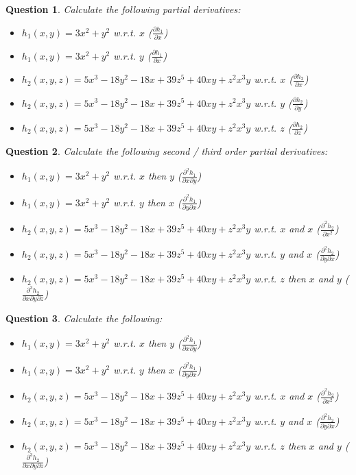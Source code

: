 \documentclass[]{article}
\newtheorem{question}{Question}
\begin{document}
	\begin{question}
		Calculate the following partial derivatives:\\
		\begin{itemize}
			\item $h_1(x,y) = 3x^2+y^2$ w.r.t. $x$ ($\frac{\partial h_1}{\partial x}$)
			\item $h_1(x,y) = 3x^2+y^2$ w.r.t. $y$ ($\frac{\partial h_1}{\partial x}$)
			\item $h_2(x,y,z) = 5x^3-18y^2-18x+39z^5+40xy+z^2x^3y$ w.r.t. $x$ ($\frac{\partial h_2}{\partial x}$)
			\item $h_2(x,y,z) = 5x^3-18y^2-18x+39z^5+40xy+z^2x^3y$ w.r.t. $y$ ($\frac{\partial h_2}{\partial y}$)
			\item $h_2(x,y,z) = 5x^3-18y^2-18x+39z^5+40xy+z^2x^3y$ w.r.t. $z$ ($\frac{\partial h_2}{\partial z}$)
		\end{itemize}
	\end{question}
	
	\begin{question}
		Calculate the following second / third order partial derivatives:\\
		\begin{itemize}
			\item $h_1(x,y) = 3x^2+y^2$ w.r.t. $x$ then $y$ ($\frac{\partial^2 h_1}{\partial x \partial y}$)
			\item $h_1(x,y) = 3x^2+y^2$ w.r.t. $y$ then $x$ ($\frac{\partial^2 h_1}{\partial y \partial x}$)
			\item $h_2(x,y,z) = 5x^3-18y^2-18x+39z^5+40xy+z^2x^3y$ w.r.t. $x$ and $x$ ($\frac{\partial^2 h_2}{\partial x^2}$)
			\item $h_2(x,y,z) = 5x^3-18y^2-18x+39z^5+40xy+z^2x^3y$ w.r.t. $y$ and $x$ ($\frac{\partial^2 h_2}{\partial y \partial x}$)
			\item $h_2(x,y,z) = 5x^3-18y^2-18x+39z^5+40xy+z^2x^3y$ w.r.t. $z$ then $x$ and $y$ ($\frac{\partial^3 h_2}{\partial x \partial y \partial z}$)
		\end{itemize}
	\end{question}
	
	\begin{question}
		Calculate the following:
		\begin{itemize}
			\item $h_1(x,y) = 3x^2+y^2$ w.r.t. $x$ then $y$ ($\frac{\partial^2 h_1}{\partial x \partial y}$)
			\item $h_1(x,y) = 3x^2+y^2$ w.r.t. $y$ then $x$ ($\frac{\partial^2 h_1}{\partial y \partial x}$)
			\item $h_2(x,y,z) = 5x^3-18y^2-18x+39z^5+40xy+z^2x^3y$ w.r.t. $x$ and $x$ ($\frac{\partial^2 h_2}{\partial x^2}$)
			\item $h_2(x,y,z) = 5x^3-18y^2-18x+39z^5+40xy+z^2x^3y$ w.r.t. $y$ and $x$ ($\frac{\partial^2 h_2}{\partial y \partial x}$)
			\item $h_2(x,y,z) = 5x^3-18y^2-18x+39z^5+40xy+z^2x^3y$ w.r.t. $z$ then $x$ and $y$ ($\frac{\partial^3 h_2}{\partial x \partial y \partial z}$)
		\end{itemize}
	\end{question}
	
	
\end{document}

